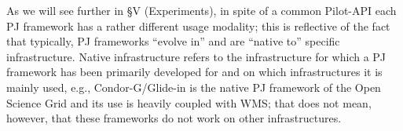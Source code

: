 \documentclass[conference]{IEEEtran}
\begin{document}
As we will see further in \S V (Experiments), in spite of a common
Pilot-API each PJ framework has a rather different usage modality;
this is reflective of the fact that typically, PJ frameworks ``evolve
in'' and are ``native to'' specific infrastructure. Native
infrastructure refers to the infrastructure for which a PJ framework
has been primarily developed for and on which infrastructures it is
mainly used, e.g., Condor-G/Glide-in is the native PJ framework of the
Open Science Grid and its use is heavily coupled with WMS; that does
not mean, however, that these frameworks do not work on other
infrastructures.










% 


\end{document}
